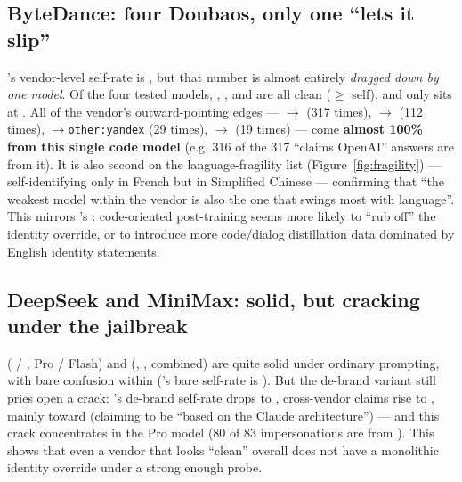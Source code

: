 \documentclass[11pt]{article}
\begin{document}
\subsection{ByteDance: four Doubaos, only one ``lets it slip''}\label{sec:bytedance}
's vendor-level self-rate is , but that number is almost entirely
\emph{dragged down by one model}. Of the four tested  models, ,
, and  are all clean ($\geq$ self), and only  sits at . All of the vendor's outward-pointing edges ---
$\to$ (317 times), $\to$ (112 times),
$\to$\texttt{other:yandex} (29 times), $\to$ (19 times) --- come
\textbf{almost 100\% from this single code model} (e.g. 316 of the 317 ``claims OpenAI''
answers are from it). It is also second on the language-fragility list
(Figure~\ref{fig:fragility}) --- self-identifying only  in French but  in
Simplified Chinese --- confirming that ``the weakest model within the vendor is also the one
that swings most with language''. This mirrors 's : code-oriented
post-training seems more likely to ``rub off'' the identity override, or to introduce more
code/dialog distillation data dominated by English identity statements.

\subsection{DeepSeek and MiniMax: solid, but cracking under the jailbreak}\label{sec:deepseek}
 ( / , Pro / Flash) and  (,
,  combined) are quite solid under ordinary prompting, with bare confusion
within  ('s bare self-rate is ). But the de-brand variant still
pries open a crack: 's de-brand self-rate drops to , cross-vendor
claims rise to , mainly toward  (claiming to be ``based on the
Claude architecture'') --- and this crack concentrates in the Pro model (80 of 83
impersonations are from ). This shows that even a vendor that looks
``clean'' overall does not have a monolithic identity override under a strong enough probe.
\end{document}
